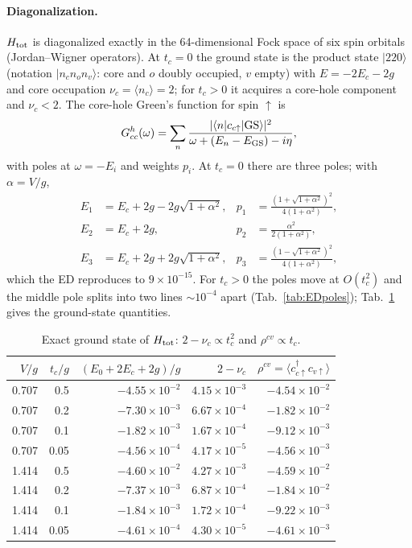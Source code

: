 \documentclass[11pt]{article}
\newcommand{\dg}{^{\dagger}}
\newcommand{\ket}[1]{|#1\rangle}
\newcommand{\braket}[1]{\langle #1\rangle}
\begin{document}
\paragraph{Diagonalization.} $H_{\rm tot}$ is diagonalized exactly in the 64-dimensional Fock space of six spin orbitals
(Jordan--Wigner operators). At $t_c=0$ the ground state is the product state $\ket{220}$
(notation $\ket{n_cn_on_v}$: core and $o$ doubly occupied, $v$ empty) with $E=-2E_c-2g$ and core occupation $\nu_c=\braket{n_c}=2$; for $t_c>0$ it acquires a
core-hole component and $\nu_c<2$. The core-hole Green's function for spin $\uparrow$ is
\begin{equation}
G^h_{cc}(\omega)=\sum_n\frac{|\braket{n|c_{c\uparrow}|{\rm GS}}|^2}{\omega+(E_n-E_{\rm GS})-i\eta},
\label{eq:Gh}
\end{equation}
with poles at $\omega=-E_i$ and weights $p_i$. At $t_c=0$ there are three poles; with $\alpha=V/g$,
\begin{equation}
\begin{aligned}
E_1&=E_c+2g-2g\sqrt{1+\alpha^2}, & p_1&=\frac{(1+\sqrt{1+\alpha^2})^2}{4(1+\alpha^2)},\\
E_2&=E_c+2g, & p_2&=\frac{\alpha^2}{2(1+\alpha^2)},\\
E_3&=E_c+2g+2g\sqrt{1+\alpha^2}, & p_3&=\frac{(1-\sqrt{1+\alpha^2})^2}{4(1+\alpha^2)},
\end{aligned}
\label{eq:poles}
\end{equation}
which the ED reproduces to $9\times10^{-15}$. For $t_c>0$ the poles move at $O(t_c^2)$ and the middle pole splits into two
lines $\sim10^{-4}$ apart (Tab.~\ref{tab:EDpoles}); Tab.~\ref{tab:ED} gives the ground-state quantities.

\begin{table}[h]
\centering
\small
\begin{tabular}{rrrrr}
\toprule
$V/g$ & $t_c/g$ & $(E_0+2E_c+2g)/g$ & $2-\nu_c$ & $\rho^{cv}=\braket{c\dg_{c\uparrow}c_{v\uparrow}}$\\
\midrule
0.707 & 0.5  & $-4.55\times10^{-2}$ & $4.15\times10^{-3}$ & $-4.54\times10^{-2}$\\
0.707 & 0.2  & $-7.30\times10^{-3}$ & $6.67\times10^{-4}$ & $-1.82\times10^{-2}$\\
0.707 & 0.1  & $-1.82\times10^{-3}$ & $1.67\times10^{-4}$ & $-9.12\times10^{-3}$\\
0.707 & 0.05 & $-4.56\times10^{-4}$ & $4.17\times10^{-5}$ & $-4.56\times10^{-3}$\\
1.414 & 0.5  & $-4.60\times10^{-2}$ & $4.27\times10^{-3}$ & $-4.59\times10^{-2}$\\
1.414 & 0.2  & $-7.37\times10^{-3}$ & $6.87\times10^{-4}$ & $-1.84\times10^{-2}$\\
1.414 & 0.1  & $-1.84\times10^{-3}$ & $1.72\times10^{-4}$ & $-9.22\times10^{-3}$\\
1.414 & 0.05 & $-4.61\times10^{-4}$ & $4.30\times10^{-5}$ & $-4.61\times10^{-3}$\\
\bottomrule
\end{tabular}
\caption{Exact ground state of $H_{\rm tot}$: $2-\nu_c\propto t_c^2$ and $\rho^{cv}\propto t_c$.}
\label{tab:ED}
\end{table}
\end{document}
